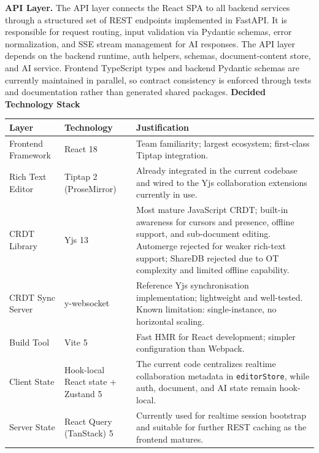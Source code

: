 \documentclass{article}
\begin{document}
\vspace{5pt}
\noindent\textbf{API Layer.} The API layer connects the React SPA to all backend services through a structured set of REST endpoints implemented in FastAPI. It is responsible for request routing, input validation via Pydantic schemas, error normalization, and SSE stream management for AI responses. The API layer depends on the backend runtime, auth helpers, schemas, document-content store, and AI service. Frontend TypeScript types and backend Pydantic schemas are currently maintained in parallel, so contract consistency is enforced through tests and documentation rather than generated shared packages.
\newpage
\textbf{Decided Technology Stack}


\noindent
{\small
\begin{tabularx}{\textwidth}{|>{\hsize=0.4\hsize\raggedright\arraybackslash}X|>{\hsize=0.5\hsize\raggedright\arraybackslash}X|>{\hsize=1.1\hsize\raggedright\arraybackslash}X|}
    \hline
    \rowcolor{tableBlue}
    \textbf{\color{white}Layer} &
    \textbf{\color{white}Technology} &
    \textbf{\color{white}Justification} \\
    \hline
    Frontend Framework & React 18 & Team familiarity; largest ecosystem; first-class Tiptap integration. \\
    \hline
    Rich Text Editor & Tiptap 2 (ProseMirror) & Already integrated in the current codebase and wired to the Yjs collaboration extensions currently in use. \\
    \hline
    CRDT Library & Yjs 13 & Most mature JavaScript CRDT; built-in awareness for cursors and presence, offline support, and sub-document editing. Automerge rejected for weaker rich-text support; ShareDB rejected due to OT complexity and limited offline capability. \\
    \hline
    CRDT Sync Server & y-websocket & Reference Yjs synchronisation implementation; lightweight and well-tested. Known limitation: single-instance, no horizontal scaling. \\
    \hline
    Build Tool & Vite 5 & Fast HMR for React development; simpler configuration than Webpack. \\
    \hline
    Client State & Hook-local React state + Zustand 5 & The current code centralizes realtime collaboration metadata in \texttt{editorStore}, while auth, document, and AI state remain hook-local. \\
    \hline
    Server State & React Query (TanStack) 5 & Currently used for realtime session bootstrap and suitable for further REST caching as the frontend matures. \\

\end{tabularx}}
\end{document}
